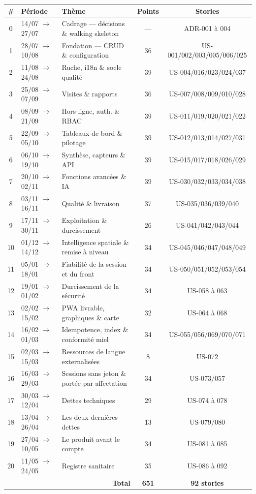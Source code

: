 \begin{center}
\begin{tabular}{clp{4.6cm}cc}
\toprule
\textbf{\#} & \textbf{Période} & \textbf{Thème} & \textbf{Points\footnotemark} & \textbf{Stories} \\
\midrule
0 & 14/07 $\rightarrow$ 27/07 & Cadrage --- décisions \& walking skeleton & --- & ADR-001 à 004 \\
1 & 28/07 $\rightarrow$ 10/08 & Fondation --- CRUD \& configuration & 36 & US-001/002/003/005/006/025 \\
2 & 11/08 $\rightarrow$ 24/08 & Ruche, i18n \& socle qualité      & 39 & US-004/016/023/024/037 \\
3 & 25/08 $\rightarrow$ 07/09 & Visites \& rapports              & 36 & US-007/008/009/010/028 \\
4 & 08/09 $\rightarrow$ 21/09 & Hors-ligne, auth. \& RBAC        & 39 & US-011/019/020/021/022 \\
5 & 22/09 $\rightarrow$ 05/10 & Tableaux de bord \& pilotage     & 39 & US-012/013/014/027/031 \\
6 & 06/10 $\rightarrow$ 19/10 & Synthèse, capteurs \& API        & 39 & US-015/017/018/026/029 \\
7 & 20/10 $\rightarrow$ 02/11 & Fonctions avancées \& IA         & 39 & US-030/032/033/034/038 \\
8 & 03/11 $\rightarrow$ 16/11 & Qualité \& livraison             & 37 & US-035/036/039/040 \\
9 & 17/11 $\rightarrow$ 30/11 & Exploitation \& durcissement     & 26 & US-041/042/043/044 \\
10 & 01/12 $\rightarrow$ 14/12 & Intelligence spatiale \& remise à niveau & 34 & US-045/046/047/048/049 \\
11 & 05/01 $\rightarrow$ 18/01 & Fiabilité de la session et du front & 34 & US-050/051/052/053/054 \\
12 & 19/01 $\rightarrow$ 01/02 & Durcissement de la sécurité      & 34 & US-058 à 063 \\
13 & 02/02 $\rightarrow$ 15/02 & PWA livrable, graphiques \& carte & 32 & US-064 à 068 \\
14 & 16/02 $\rightarrow$ 01/03 & Idempotence, index \& conformité miel & 34 & US-055/056/069/070/071 \\
15 & 02/03 $\rightarrow$ 15/03 & Ressources de langue externalisées & 8 & US-072 \\
16 & 16/03 $\rightarrow$ 29/03 & Sessions sans jeton \& portée par affectation & 34 & US-073/057 \\
17 & 30/03 $\rightarrow$ 12/04 & Dettes techniques                & 29 & US-074 à 078 \\
18 & 13/04 $\rightarrow$ 26/04 & Les deux dernières dettes        & 13 & US-079/080 \\
19 & 27/04 $\rightarrow$ 10/05 & Le produit avant le compte       & 34 & US-081 à 085 \\
20 & 11/05 $\rightarrow$ 24/05 & Registre sanitaire              & 35 & US-086 à 092 \\
\midrule
\multicolumn{3}{r}{\textbf{Total}} & \textbf{651} & \textbf{92 stories} \\
\bottomrule
\end{tabular}
\end{center}
